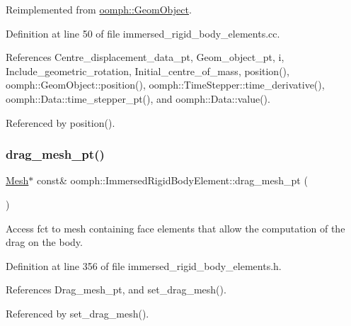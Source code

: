 Reimplemented from \hyperlink{classoomph_1_1GeomObject_aa46469e491d25eda8dbe213f07152974}{oomph\+::\+Geom\+Object}.



Definition at line 50 of file immersed\+\_\+rigid\+\_\+body\+\_\+elements.\+cc.



References Centre\+\_\+displacement\+\_\+data\+\_\+pt, Geom\+\_\+object\+\_\+pt, i, Include\+\_\+geometric\+\_\+rotation, Initial\+\_\+centre\+\_\+of\+\_\+mass, position(), oomph\+::\+Geom\+Object\+::position(), oomph\+::\+Time\+Stepper\+::time\+\_\+derivative(), oomph\+::\+Data\+::time\+\_\+stepper\+\_\+pt(), and oomph\+::\+Data\+::value().



Referenced by position().

\mbox{\label{classoomph_1_1ImmersedRigidBodyElement_ab5570597c7962806448af56aac4ac3cd}} 
\subsubsection{\texorpdfstring{drag\+\_\+mesh\+\_\+pt()}{drag\_mesh\_pt()}}
{\footnotesize\ttfamily \hyperlink{classoomph_1_1Mesh}{Mesh}$\ast$ const\& oomph\+::\+Immersed\+Rigid\+Body\+Element\+::drag\+\_\+mesh\+\_\+pt (\begin{DoxyParamCaption}{ }\end{DoxyParamCaption})\hspace{0.3cm}{\ttfamily [inline]}}



Access fct to mesh containing face elements that allow the computation of the drag on the body. 



Definition at line 356 of file immersed\+\_\+rigid\+\_\+body\+\_\+elements.\+h.



References Drag\+\_\+mesh\+\_\+pt, and set\+\_\+drag\+\_\+mesh().



Referenced by set\+\_\+drag\+\_\+mesh().

\mbox{\label{classoomph_1_1ImmersedRigidBodyElement_abe0594b64f31848ebb05866fe0cde688}} 
